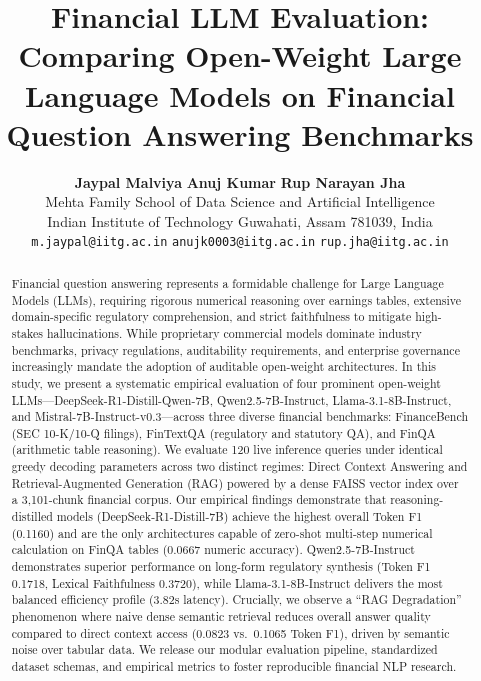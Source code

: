 \documentclass[11pt]{article}
\title{\textbf{Financial LLM Evaluation: Comparing Open-Weight Large Language Models on Financial Question Answering Benchmarks}}
\author{
  \textbf{Jaypal Malviya} \quad \textbf{Anuj Kumar} \quad \textbf{Rup Narayan Jha} \\
  Mehta Family School of Data Science and Artificial Intelligence \\
  Indian Institute of Technology Guwahati, Assam 781039, India \\
  \texttt{m.jaypal@iitg.ac.in} \quad \texttt{anujk0003@iitg.ac.in} \quad \texttt{rup.jha@iitg.ac.in}
}
\date{}
\begin{document}
\maketitle

\begin{abstract}
Financial question answering represents a formidable challenge for Large Language Models (LLMs), requiring rigorous numerical reasoning over earnings tables, extensive domain-specific regulatory comprehension, and strict faithfulness to mitigate high-stakes hallucinations. While proprietary commercial models dominate industry benchmarks, privacy regulations, auditability requirements, and enterprise governance increasingly mandate the adoption of auditable open-weight architectures. In this study, we present a systematic empirical evaluation of four prominent open-weight LLMs---DeepSeek-R1-Distill-Qwen-7B, Qwen2.5-7B-Instruct, Llama-3.1-8B-Instruct, and Mistral-7B-Instruct-v0.3---across three diverse financial benchmarks: FinanceBench (SEC 10-K/10-Q filings), FinTextQA (regulatory and statutory QA), and FinQA (arithmetic table reasoning). We evaluate 120 live inference queries under identical greedy decoding parameters across two distinct regimes: Direct Context Answering and Retrieval-Augmented Generation (RAG) powered by a dense FAISS vector index over a 3,101-chunk financial corpus. Our empirical findings demonstrate that reasoning-distilled models (DeepSeek-R1-Distill-7B) achieve the highest overall Token F1 (0.1160) and are the only architectures capable of zero-shot multi-step numerical calculation on FinQA tables (0.0667 numeric accuracy). Qwen2.5-7B-Instruct demonstrates superior performance on long-form regulatory synthesis (Token F1 0.1718, Lexical Faithfulness 0.3720), while Llama-3.1-8B-Instruct delivers the most balanced efficiency profile (3.82s latency). Crucially, we observe a ``RAG Degradation'' phenomenon where naive dense semantic retrieval reduces overall answer quality compared to direct context access (0.0823 vs.\ 0.1065 Token F1), driven by semantic noise over tabular data. We release our modular evaluation pipeline, standardized dataset schemas, and empirical metrics to foster reproducible financial NLP research.
\end{abstract}
\end{document}
